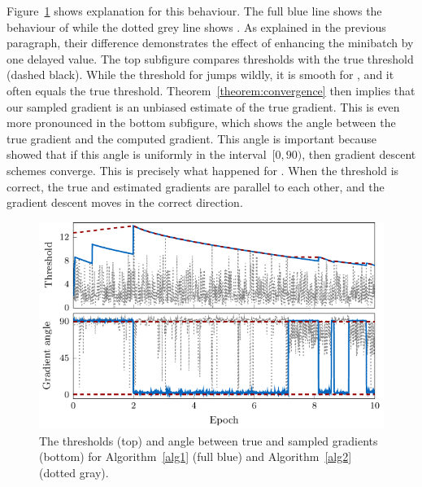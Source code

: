 Figure~\ref{fig:thresholds2} shows explanation for this behaviour. The full blue line shows the behaviour of \DeepTopPush while the dotted grey line shows \PatMatNP. As explained in the previous paragraph, their difference demonstrates the effect of enhancing the minibatch by one delayed value. The top subfigure compares thresholds with the true threshold (dashed black). While the threshold for \PatMatNP jumps wildly, it is smooth for \DeepTopPush, and it often equals the true threshold. Theorem~\ref{theorem:convergence} then implies that our sampled gradient is an unbiased estimate of the true gradient. This is even more pronounced in the bottom subfigure, which shows the angle between the true gradient and the computed gradient. This angle is important because~\cite{nocedal2006numerical} showed that if this angle is uniformly in the interval~$[0,90)$, then gradient descent schemes converge. This is precisely what happened for \DeepTopPush. When the threshold is correct, the true and estimated gradients are parallel to each other, and the gradient descent moves in the correct direction.

\begin{figure}[!ht]
  \centering
  \includegraphics[width = \linewidth]{images/deep_thresholds.pdf}
  \caption{The thresholds (top) and angle between true and sampled gradients (bottom) for Algorithm~\ref{alg1} (full blue) and Algorithm~\ref{alg2} (dotted gray).}
  \label{fig:thresholds2}
\end{figure}